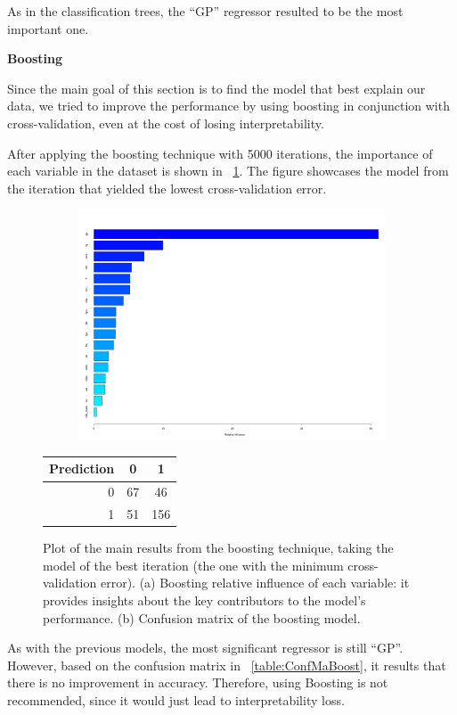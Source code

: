 As in the classification trees, the ``GP'' regressor resulted to be the most important one.

\vspace{0.2cm}
\noindent
\textbf{Boosting}

Since the main goal of this section is to find the model that best explain our data, we tried to improve the performance by using boosting in conjunction with cross-validation, even at the cost of losing interpretability. 

After applying the boosting technique with 5000 iterations, the importance of each variable in the dataset is shown in \Fig~\ref{fig:boost_4_rel_inf}. The figure showcases the model from the iteration that yielded the lowest cross-validation error.

\begin{figure}[h]
	\centering
	\begin{subfigure}{0.5\textwidth}
		\centering
		\includegraphics[width=0.8\linewidth]{ImageFiles/Classification/Trees/boost_4_rel_inf_best.pdf}
		\caption{}
		\label{fig:boost_4_rel_inf}
	\end{subfigure}%
	\hfill
	\begin{subtable}{0.5\textwidth}
		\centering
		\begin{tabular}{|| cr | cc ||}    
			\hline
			\multicolumn{2}{|c|}{Prediction} 
			& 0 & 1 \\
			\hline
			\hline
			& 0 & 67 & 46 \\
			& 1 & 51 & 156 \\
			\hline
		\end{tabular}
		\caption{}
		\label{table:ConfMaBoost}
	\end{subtable}
	\caption{Plot of the main results from the boosting technique, taking the model of the best iteration (the one with the minimum cross-validation error). (a) Boosting relative influence of each variable: it provides insights about the key contributors to the model's performance. (b) Confusion matrix of the boosting model.}
	\label{BoostRes}
\end{figure}

As with the previous models, the most significant regressor is still ``GP''. However, based on the confusion matrix in \Tab~\ref{table:ConfMaBoost}, it results that there is no improvement in accuracy. Therefore, using Boosting is not recommended, since it would just lead to interpretability loss.

